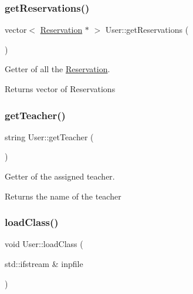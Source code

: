 \subsubsection{\texorpdfstring{get\+Reservations()}{getReservations()}}
{\footnotesize\ttfamily vector$<$ \mbox{\hyperlink{class_reservation}{Reservation}} $\ast$ $>$ User\+::get\+Reservations (\begin{DoxyParamCaption}{ }\end{DoxyParamCaption})}



Getter of all the \mbox{\hyperlink{class_reservation}{Reservation}}. 

\begin{DoxyReturn}{Returns}
vector of Reservations 
\end{DoxyReturn}
\mbox{\label{class_user_ac9fcbd4f944689de5faf746aa277d81a}} 
\subsubsection{\texorpdfstring{get\+Teacher()}{getTeacher()}}
{\footnotesize\ttfamily string User\+::get\+Teacher (\begin{DoxyParamCaption}{ }\end{DoxyParamCaption})}



Getter of the assigned teacher. 

\begin{DoxyReturn}{Returns}
the name of the teacher 
\end{DoxyReturn}
\mbox{\label{class_user_abc12a9ca668bd860a3d6d2ae4791997d}} 
\subsubsection{\texorpdfstring{load\+Class()}{loadClass()}}
{\footnotesize\ttfamily void User\+::load\+Class (\begin{DoxyParamCaption}\item[{std\+::ifstream \&}]{inpfile }\end{DoxyParamCaption})\hspace{0.3cm}{\ttfamily [virtual]}}



